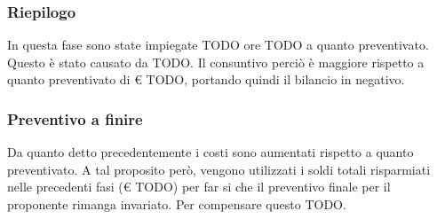 		\subsubsection{Riepilogo} %
		In questa fase sono state impiegate TODO ore TODO a quanto preventivato. \newline
		Questo è stato causato da TODO. \newline
		Il consuntivo perciò è maggiore rispetto a quanto preventivato di \euro{} TODO, portando quindi il bilancio in negativo.


		\subsubsection{Preventivo a finire} %
		Da quanto detto precedentemente i costi sono aumentati rispetto a quanto preventivato. A tal proposito però, vengono utilizzati i soldi totali risparmiati nelle precedenti fasi (\euro{} TODO) per far si che il preventivo finale per il proponente rimanga invariato. \newline
		Per compensare questo TODO.


